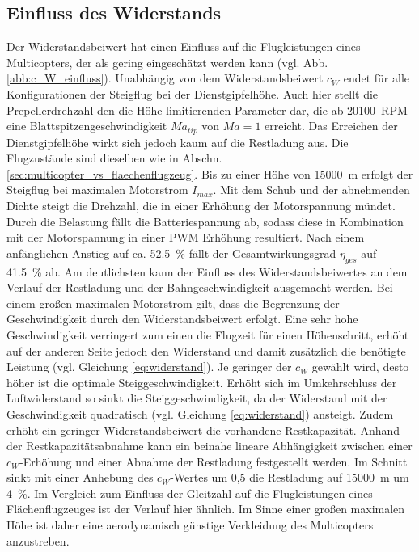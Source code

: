 \subsection{Einfluss des Widerstands}
\label{subsec:widerstandseinfluss}
Der Widerstandsbeiwert hat einen Einfluss auf die Flugleistungen eines Multicopters, der als gering eingeschätzt werden kann (vgl. Abb. \ref{abb:c_W_einfluss}). Unabhängig von dem Widerstandsbeiwert \ensuremath{c_W} endet für alle Konfigurationen der Steigflug bei der Dienstgipfelhöhe. Auch hier stellt die Prepellerdrehzahl den die Höhe limitierenden Parameter dar, die ab \SI{20100}{RPM} eine Blattspitzengeschwindigkeit \ensuremath{Ma_{tip}} von \ensuremath{Ma = 1} erreicht. Das Erreichen der Dienstgipfelhöhe wirkt sich jedoch kaum auf die Restladung aus.
Die Flugzustände sind dieselben wie in Abschn. \ref{sec:multicopter_vs_flaechenflugzeug}. Bis zu einer Höhe von \SI{15000}{m} erfolgt der Steigflug bei maximalen Motorstrom \ensuremath{I_{max}}. Mit dem Schub und der abnehmenden Dichte steigt die Drehzahl, die in einer Erhöhung der Motorspannung mündet. Durch die Belastung fällt die Batteriespannung ab, sodass diese in Kombination mit der Motorspannung in einer PWM Erhöhung resultiert. Nach einem anfänglichen Anstieg auf ca. \SI{52,5}{\%} fällt der Gesamtwirkungsgrad \ensuremath{\eta_{ges}} auf \SI{41,5}{\%} ab. 
Am deutlichsten kann der Einfluss des Widerstandsbeiwertes an dem Verlauf der Restladung und der Bahngeschwindigkeit ausgemacht werden. 
Bei einem großen maximalen Motorstrom gilt, dass die Begrenzung der Geschwindigkeit durch den Widerstandsbeiwert erfolgt. Eine sehr hohe Geschwindigkeit verringert zum einen die Flugzeit für einen Höhenschritt, erhöht auf der anderen Seite jedoch den Widerstand und damit zusätzlich die benötigte Leistung (vgl. Gleichung \ref{eq:widerstand}). Je geringer der \ensuremath{c_W} gewählt wird, desto höher ist die optimale Steiggeschwindigkeit. Erhöht sich im Umkehrschluss der Luftwiderstand so sinkt die Steiggeschwindigkeit, da der Widerstand mit der Geschwindigkeit quadratisch (vgl. Gleichung \ref{eq:widerstand}) ansteigt. Zudem erhöht ein geringer Widerstandsbeiwert die vorhandene Restkapazität. Anhand der Restkapazitätsabnahme kann ein beinahe lineare Abhängigkeit zwischen einer \ensuremath{c_W}-Erhöhung und einer Abnahme der Restladung festgestellt werden. Im Schnitt sinkt mit einer Anhebung des \ensuremath{c_W}-Wertes um 0,5 die Restladung auf \SI{15000}{m} um \SI{4}{\%}. Im Vergleich zum Einfluss der Gleitzahl auf die Flugleistungen eines Flächenflugzeuges ist der Verlauf hier ähnlich. 
Im Sinne einer großen maximalen Höhe ist daher eine aerodynamisch günstige Verkleidung des Multicopters anzustreben.
  
